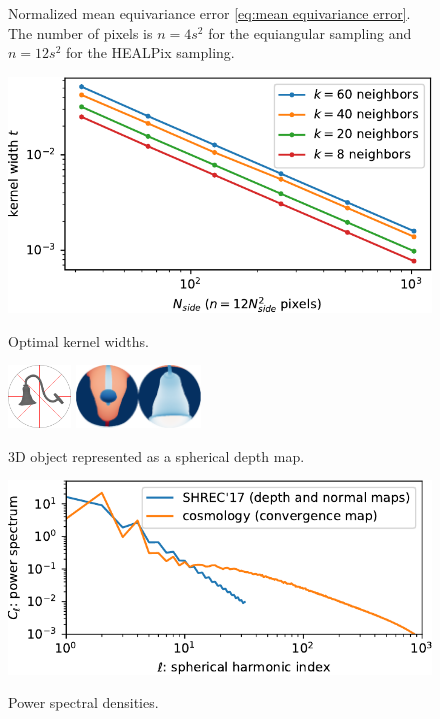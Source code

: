 \documentclass{article} %
\begin{document}
\begin{figure}
\begin{minipage}{0.6\linewidth}
		\caption{Normalized mean equivariance error \eqref{eq:mean equivariance error}. The number of pixels is $n = 4 s^2$ for the equiangular sampling and $n = 12 s^2$ for the HEALPix sampling.}
		\label{fig:equivariance_error}
	\end{minipage}
	\hfill
	\begin{minipage}{0.35\linewidth}
		\centering
		\includegraphics[width=\linewidth]{kernel_widths}
		\caption{Optimal kernel widths.}
		\label{fig:kernel_widths}
		\vspace{1em}
		\includegraphics[height=4.5em]{lamp_000018}
		\hfill
		\includegraphics[height=4.5em]{lamp_000018_sphere_nobar}
		\caption{3D object represented as a spherical depth map.}
		\label{fig:depthmap}
		\vspace{1em}
		\includegraphics[width=\linewidth]{spectrum}
		\caption{Power spectral densities.}
		\label{fig:spectrum}
	\end{minipage}
	\vspace{-0.5cm}
\end{figure}
\end{document}

